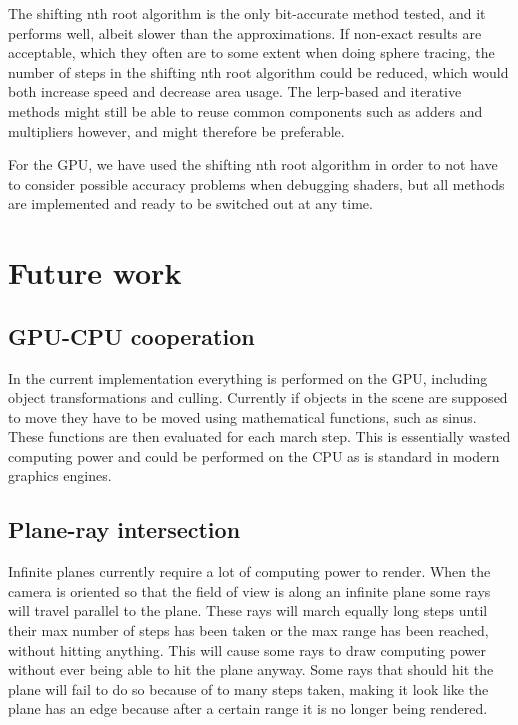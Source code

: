 		The shifting nth root algorithm is the only bit-accurate method tested,
		and it performs well, albeit slower than the approximations. If
		non-exact results are acceptable, which they often are to some extent
		when doing sphere tracing, the number of steps in the shifting nth root
		algorithm could be reduced, which would both increase speed and
		decrease area usage. The lerp-based and iterative methods might still
		be able to reuse common components such as adders and multipliers
		however, and might therefore be preferable.
		
		For the GPU, we have used the shifting nth root algorithm in order
		to not have to consider possible accuracy problems when debugging
		shaders, but all methods are implemented and ready to be switched out
		at any time.

	\section{Future work} \label{futureoptimizations} 

		\subsection{GPU-CPU cooperation}

			In the current implementation everything is performed on the GPU,
			including object transformations and culling. Currently if objects
			in the scene are supposed to move they have to be moved using
			mathematical functions, such as sinus. These functions are then
			evaluated for each march step. This is essentially wasted computing
			power and could be performed on the CPU as is standard in modern
			graphics engines.

		\subsection{Plane-ray intersection}

			Infinite planes currently require a lot of computing power to
			render. When the camera is oriented so that the field of view is
			along an infinite plane some rays will travel parallel to the
			plane. These rays will march equally long steps until their max
			number of steps has been taken or the max range has been reached, 
			without hitting anything. This will cause some rays to draw 
			computing power without ever being able to hit the plane anyway. 
			Some rays that should hit the plane will fail to do so because of 
			to many steps taken, making it look like the plane has an edge 
			because after a certain range it is no longer being rendered.


